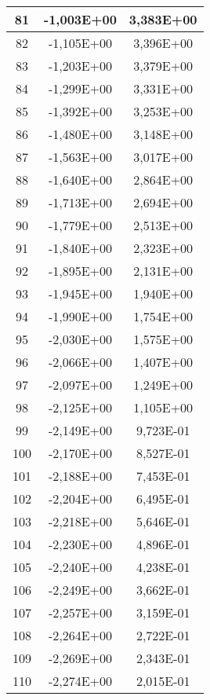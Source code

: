\documentclass[12pt]{article}
\begin{document}
\begin{center}
\begin{longtable}{|c|c|c|}
    81	&     -1,003E+00	&   3,383E+00 \\ \hline
    82	&     -1,105E+00	&   3,396E+00 \\ \hline
    83	&     -1,203E+00	&   3,379E+00 \\ \hline
    84	&     -1,299E+00	&   3,331E+00 \\ \hline
    85	&     -1,392E+00	&   3,253E+00 \\ \hline
    86	&     -1,480E+00	&   3,148E+00 \\ \hline
    87	&     -1,563E+00	&   3,017E+00 \\ \hline
    88	&     -1,640E+00	&   2,864E+00 \\ \hline
    89	&     -1,713E+00	&   2,694E+00 \\ \hline
    90	&     -1,779E+00	&   2,513E+00 \\ \hline
    91	&     -1,840E+00	&   2,323E+00 \\ \hline
    92	&     -1,895E+00	&   2,131E+00 \\ \hline
    93	&     -1,945E+00	&   1,940E+00 \\ \hline
    94	&     -1,990E+00	&   1,754E+00 \\ \hline
    95	&     -2,030E+00	&   1,575E+00 \\ \hline
    96	&     -2,066E+00	&   1,407E+00 \\ \hline
    97	&     -2,097E+00	&   1,249E+00 \\ \hline
    98	&     -2,125E+00	&   1,105E+00 \\ \hline
    99	&     -2,149E+00	&   9,723E-01 \\ \hline
    100	&     -2,170E+00	&   8,527E-01 \\ \hline
    101	&     -2,188E+00	&   7,453E-01 \\ \hline
    102	&     -2,204E+00	&   6,495E-01 \\ \hline
    103	&     -2,218E+00	&   5,646E-01 \\ \hline
    104	&     -2,230E+00	&   4,896E-01 \\ \hline
    105	&     -2,240E+00	&   4,238E-01 \\ \hline
    106	&     -2,249E+00	&   3,662E-01 \\ \hline
    107	&     -2,257E+00	&   3,159E-01 \\ \hline
    108	&     -2,264E+00	&   2,722E-01 \\ \hline
    109	&     -2,269E+00	&   2,343E-01 \\ \hline
    110	&     -2,274E+00	&   2,015E-01 \\ \hline

\end{longtable}
\end{center}
\end{document}
